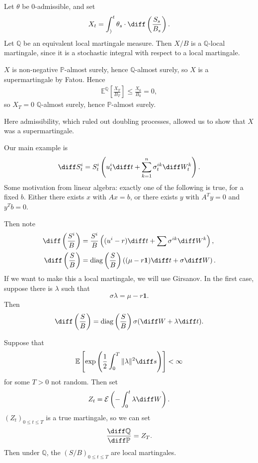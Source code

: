 \documentclass[12pt]{article}
\begin{document}
\begin{proofbox}
	Let $\theta$ be 0-admissible, and set 
	\[
	X_t = \int_)^{t} \theta_s \cdot \diff \left( \frac{S_s}{B_s} \right).
	\]
	Let $\mathbb{Q}$ be an equivalent local martingale measure. Then $X/B$ is a $\mathbb{Q}$-local martingale, since it is a stochastic integral with respect to a local martingale.

	$X$ is non-negative $\mathbb{P}$-almost surely, hence $\mathbb{Q}$-almost surely, so $X$ is a supermartingale by Fatou. Hence
	\begin{align*}
		\mathbb{E}^{\mathbb{Q}} \left[ \frac{X_T}{B_T} \right] \leq \frac{X_0}{B_0} = 0,
	\end{align*}
	so $X_T = 0$ $\mathbb{Q}$-almost surely, hence $\mathbb{P}$-almost surely.
\end{proofbox}

Here admissibility, which ruled out doubling processes, allowed us to show that $X$ was a supermartingale.

Our main example is
\[
	\diff S_t^{i} = S_t^{i} \left(u_t^{i} \diff t + \sum_{k = 1}^{n} \sigma_t^{ik} \diff W_t^{k} \right).
\]
Some motivation from linear algebra: exactly one of the following is true, for a fixed $b$. Either there exists $x$ with $Ax = b$, or there exists $y$ with $A^{T}y = 0$ and $y^{T}b = 0$.

Then note
\begin{align*}
	\diff\left( \frac{S^i}{B} \right) &= \frac{S^i}{B} \left( (u^i - r) \diff t + \sum \sigma^{ik} \diff W^{k} \right), \\
	\diff \left( \frac{S}{B} \right) &= \mathrm{diag} \left( \frac{S}{B} \right) \left( (\mu - r \mathbf{1}) \diff t + \sigma \diff W \right).
\end{align*}
If we want to make this a local martingale, we will use Girsanov. In the first case, suppose there is $\lambda$ such that
\[
\sigma \lambda = \mu - r \mathbf{1}.
\]
Then
\[
	\diff \left( \frac{S}{B} \right) = \mathrm{diag} \left( \frac{S}{B} \right) \sigma(\diff W + \lambda \diff t ).
\]
\begin{theorem}
	Suppose that
	\[
		\mathbb{E}\left[ \exp \left( \frac 12 \int_0^{T} \|\lambda\|^2 \diff s \right) \right] < \infty
	\]
	for some $T > 0$ not random. Then set
	\[
	Z_t = \mathcal{E} \left( - \int_0^{t} \lambda \diff W \right).
	\]
	$(Z_t)_{0 \leq t \leq T}$ is a true martingale, so we can set
	\[
	\frac{\diff \mathbb{Q}}{\diff \mathbb{P}} = Z_T.
	\]
	Then under $\mathbb{Q}$, the $(S/B)_{0 \leq t \leq T}$ are local martingales.
\end{theorem}
\end{document}
